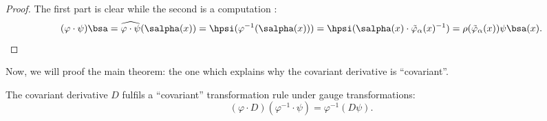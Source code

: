 \begin{proof}
The first part is clear while the second is a computation :
\begin{equation}
    (\varphi\cdot\psi)\bsa=\widehat{\varphi\cdot\psi}(\salpha(x))
                         =\hpsi(\varphi^{-1}(\salpha(x)))
			 =\hpsi(\salpha(x)\cdot\tilde{\varphi}_{\alpha}(x)^{-1})
			 =\rho(\tilde{\varphi}_{\alpha}(x))\psi\bsa(x).
\end{equation}
\end{proof}

Now, we will proof the main theorem: the one which explains why the covariant derivative is ``covariant''.

\begin{theorem}\label{th:covariance}
The covariant derivative $D$ fulfils a ``covariant'' transformation rule under gauge transformations:
\begin{equation}\label{eq:covariance_math}
      (\varphi\cdot D)(\varphi^{-1}\cdot \psi)=\varphi^{-1}(D\psi).
\end{equation}
\end{theorem}


